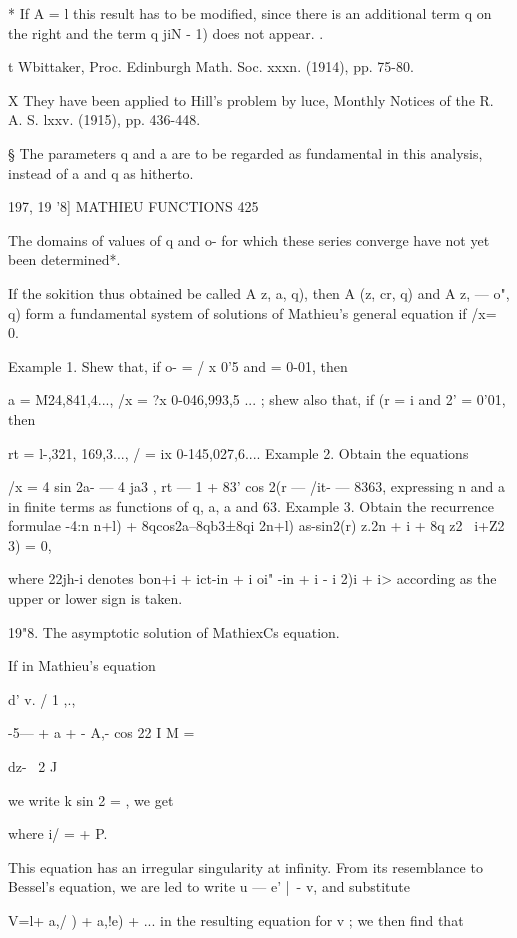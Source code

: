 {{* If A  = l this result has to be modified, since there is an additional term q on the right and 
the term q jiN - 1) does not appear. . 

t Wbittaker, Proc. Edinburgh Math. Soc. xxxn. (1914), pp. 75-80. 

X They have been applied to Hill's problem by luce, Monthly Notices of the R. A. S. lxxv. 
(1915), pp. 436-448. 

§ The parameters q and a are to be regarded as fundamental in this analysis, instead of 
a and q as hitherto. 



197, 19 '8] MATHIEU FUNCTIONS 425 

The domains of values of q and o- for which these series converge have not yet been 
determined*. 

If the sokition thus obtained be called A  z, a, q), then A (z, cr, q) and A  z, — o", q) form 
a fundamental system of solutions of Mathieu's general equation if /x= 0. 

Example 1. Shew that, if o- = / x 0'5 and   = 0-01, then 

a = M24,841,4..., /x = ?x 0-046,993,5 ... ; 
shew also that, if (r = i and 2' = 0'01, then 

rt = l-,321, 169,3..., /  = ix 0-145,027,6.... 
Example 2. Obtain the equations 

/x = 4  sin 2a- — 4 ja3 , 
rt — 1 + 83' cos 2(r — /it- — 8363, 
expressing n and a in finite terms as functions of q, a, a  and 63. 
Example 3. Obtain the recurrence formulae 
 -4:n n+l) + 8qcos2a--8qb3±8qi 2n+l) as-sin2(r) z.2n + i + 8q z2 \ i+Z2  3) = 0, 

where 22jh-i denotes bon+i + ict-in + i oi"  -in + i - i 2)i + i> according as the upper or lower sign is 
taken. 

19"8. The asymptotic solution of MathiexCs equation. 

If in Mathieu's equation 

d' v. / 1 ,.,   \ 

-5— + a + - A,- cos 22 I M = 

dz- \ 2 J 

we write k sin 2 =  , we get 

where i/   =   +  P. 

This equation has an irregular singularity at infinity. From its resemblance to Bessel's 
equation, we are led to write u — e'  |~- v, and substitute 

V=l+ a,/ ) +  a,!e) + ... 
in the resulting equation for v ; we then find that 

}}
